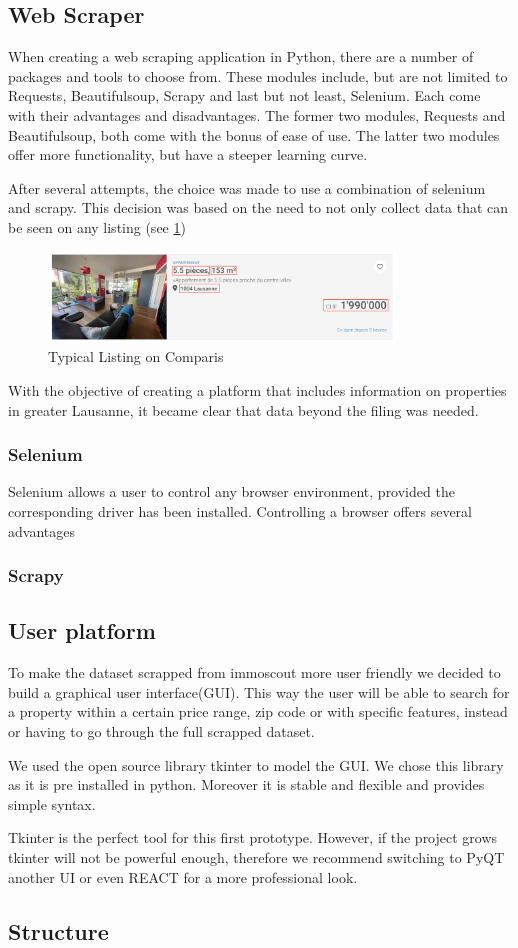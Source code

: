 \documentclass[main]{subfiles}
\begin{document}
\subsection{Web Scraper}

When creating a web scraping application in Python, there are a number of packages and tools to choose from.
These modules include, but are not limited to Requests, Beautifulsoup, Scrapy and last but not least, Selenium.
Each come with their advantages and disadvantages. 
The former two modules, Requests and Beautifulsoup, both come with the bonus of ease of use.
The latter two modules offer more functionality, but have a steeper learning curve.

After several attempts, the choice was made to use a combination of selenium and scrapy.
This decision was based on the need to not only collect data that can be seen on any listing (see \ref{fig:listing}) 
\begin{figure}[htbp]
    \centerline{
        \includegraphics[width = 92mm]{prog_1.png}}
    \caption{Typical Listing on Comparis}
    \label{fig:listing}
\end{figure}

With the objective of creating a platform that includes information on properties in greater Lausanne, 
it became clear that data beyond the filing was needed.


\subsubsection{Selenium}
Selenium allows a user to control any browser environment, provided the corresponding driver has been installed.
Controlling a browser offers several advantages 

\subsubsection{Scrapy}




\subsection{User platform}
To make the dataset scrapped from immoscout more user friendly we decided to build a graphical user interface(GUI).
This way the user will be able to search for a property within a certain price range, zip code or with specific features, 
instead or having to go through the full scrapped dataset.\par
We used the open source library tkinter to model the GUI. We chose this library as it is pre installed in python.
Moreover it is stable and flexible and provides simple syntax.\par
Tkinter is the perfect tool for this first prototype. However, if the project grows tkinter will not be powerful enough,
therefore we recommend switching to PyQT another UI or even REACT for a more professional look. 


\subsection{Structure}
\end{document}
